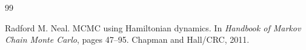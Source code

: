 \documentclass{scrartcl}
\begin{document}
\begin{thebibliography}{99}

Radford M. Neal.
\newblock MCMC using Hamiltonian dynamics.
\newblock In \emph{Handbook of Markov Chain Monte Carlo}, pages 47--95.
\newblock Chapman and Hall/CRC, 2011.







  



  


\end{thebibliography}
\end{document}
